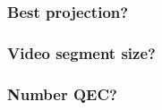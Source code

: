 \begin{frame}[c]
   \frametitle{Best projection?}

   \begin{independentCounter}
      
   \end{independentCounter}
\end{frame}

\begin{frame}[c]
   \frametitle{Video segment size?}

   \begin{independentCounter}
      
   \end{independentCounter}
\end{frame}

\begin{frame}[c]
   \frametitle{Number QEC?}

   \begin{independentCounter}
      
   \end{independentCounter}
\end{frame}
